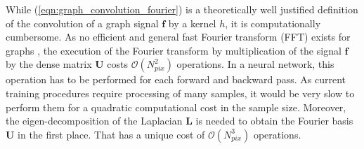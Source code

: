 \documentclass[final,twocolumn,3p,times,sort&compress]{elsarticle}
\newcommand{\eqnref}[1]{(\ref{eqn:#1})}
\renewcommand{\b}[1]{{\bm{#1}}}   %
\newcommand{\1}{\b{1}}              %
\newcommand{\0}{\b{0}}              %
\renewcommand{\L}{\b{L}}
\newcommand{\U}{\b{U}}
\newcommand{\f}{\b{f}}
\newcommand{\bO}{\mathcal{O}}
\begin{document}
While \eqnref{graph_convolution_fourier} is a theoretically well justified definition of the convolution of a graph signal $\f$ by a kernel $h$, it is computationally cumbersome.
As no efficient and general fast Fourier transform (FFT) exists for graphs \citep{le2018fgft}, the execution of the Fourier transform by multiplication of the signal $\f$ by the dense matrix $\U$ costs $\bO(N_{pix}^2)$ operations.
In a neural network, this operation has to be performed for each forward and backward pass.
As current training procedures require processing of many samples, it would be very slow to perform them for a quadratic computational cost in the sample size.
Moreover, the eigen-decomposition of the Laplacian $\L$ is needed to obtain the Fourier basis $\U$ in the first place.
That has a unique cost of $\bO(N_{pix}^3)$ operations.
\end{document}

